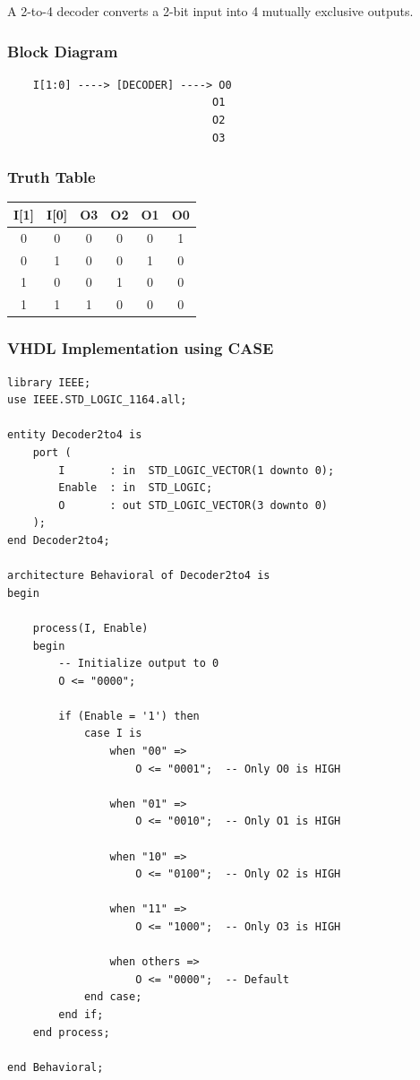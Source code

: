\documentclass[12pt,a4paper]{article}
\begin{document}
A 2-to-4 decoder converts a 2-bit input into 4 mutually exclusive outputs.

\subsubsection{Block Diagram}
\begin{lstlisting}
    I[1:0] ----> [DECODER] ----> O0
                                O1
                                O2
                                O3
\end{lstlisting}

\subsubsection{Truth Table}
\begin{table}[h]
\centering
\begin{tabular}{|c|c|c|c|c|c|}
\hline
\textbf{I[1]} & \textbf{I[0]} & \textbf{O3} & \textbf{O2} & \textbf{O1} & \textbf{O0} \\
\hline
0 & 0 & 0 & 0 & 0 & 1 \\
\hline
0 & 1 & 0 & 0 & 1 & 0 \\
\hline
1 & 0 & 0 & 1 & 0 & 0 \\
\hline
1 & 1 & 1 & 0 & 0 & 0 \\
\hline
\end{tabular}
\end{table}

\subsubsection{VHDL Implementation using CASE}

\begin{lstlisting}
library IEEE;
use IEEE.STD_LOGIC_1164.all;

entity Decoder2to4 is
    port (
        I       : in  STD_LOGIC_VECTOR(1 downto 0);
        Enable  : in  STD_LOGIC;
        O       : out STD_LOGIC_VECTOR(3 downto 0)
    );
end Decoder2to4;

architecture Behavioral of Decoder2to4 is
begin
    
    process(I, Enable)
    begin
        -- Initialize output to 0
        O <= "0000";
        
        if (Enable = '1') then
            case I is
                when "00" =>
                    O <= "0001";  -- Only O0 is HIGH
                
                when "01" =>
                    O <= "0010";  -- Only O1 is HIGH
                
                when "10" =>
                    O <= "0100";  -- Only O2 is HIGH
                
                when "11" =>
                    O <= "1000";  -- Only O3 is HIGH
                
                when others =>
                    O <= "0000";  -- Default
            end case;
        end if;
    end process;
    
end Behavioral;
\end{lstlisting}
\end{document}
